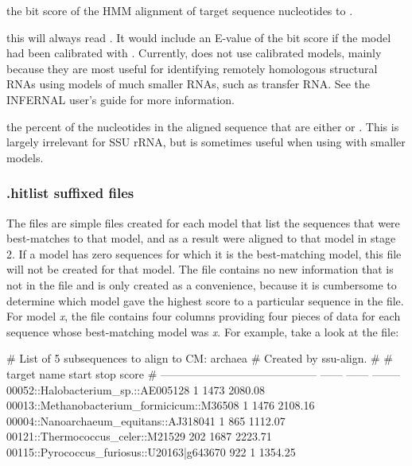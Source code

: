 \begin{wideitem}

\item[\emprog{bit sc}] the bit score of the HMM alignment of
  target sequence nucleotides  to .

\item[\emprog{E-value}] this will always read \prog{-}. It would
  include an E-value of the bit score if the model had been calibrated
  with . Currently,  does not use
  calibrated models, mainly because they are most useful for
  identifying remotely homologous structural RNAs using models of
  much smaller RNAs, such as transfer RNA. See the INFERNAL 
  user's guide \cite{Nawrocki09} for more information.

\item[\emprog{GC\%}] the percent of the nucleotides in the aligned
  sequence that are either  or . This is largely
  irrelevant for SSU rRNA, but is sometimes useful when using
   with smaller models.
\end{wideitem}

\subsubsection{.hitlist suffixed files}

The  files are simple files created for each model
that list the sequences that were best-matches to that model, and as a
result were aligned to that model in stage 2. If a model has zero
sequences for which it is the best-matching model, this file will not
be created for that model. The file contains no new information that is not in the
 file and is only created as a convenience, because it is
cumbersome to determine which model gave the highest score to a
particular sequence in the  file.  For model \emph{x}, the
 file contains four columns providing four pieces of
data for each sequence whose best-matching model was \emph{x}. For
example, take a look at the 
file:

\begin{sreoutput}
# List of 5 subsequences to align to CM: archaea
# Created by ssu-align.
#
# target name                                  start    stop     score
# ------------------------------------------  ------  ------  --------
  00052::Halobacterium_sp.::AE005128               1    1473   2080.08
  00013::Methanobacterium_formicicum::M36508       1    1476   2108.16
  00004::Nanoarchaeum_equitans::AJ318041           1     865   1112.07
  00121::Thermococcus_celer::M21529              202    1687   2223.71
  00115::Pyrococcus_furiosus::U20163|g643670     922       1   1354.25
\end{sreoutput}

